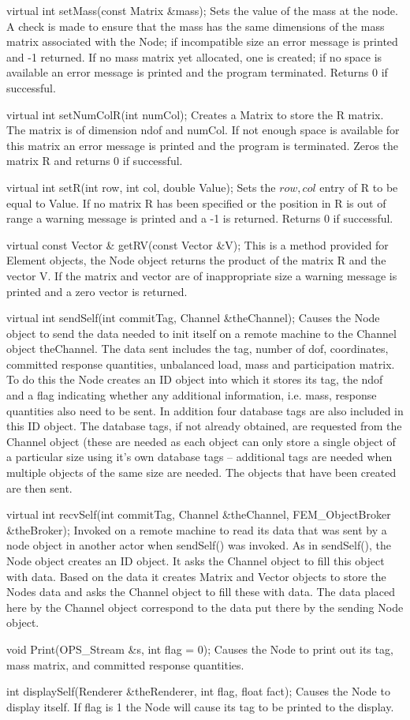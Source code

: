  virtual int setMass(const Matrix &mass); 
Sets the value of the mass at the node. A check is made to ensure that
the  mass has the same dimensions of the mass matrix associated with the
Node; if incompatible size an error message is printed and -1 returned. If no
mass matrix yet allocated, one is created; if no space is available an
error message is printed and the program terminated. Returns 0 if successful. 

  virtual int setNumColR(int numCol); 
Creates a Matrix to store the R matrix. The matrix is of dimension
 ndof and  numCol. If not enough space is available for this
matrix an error message is printed and the program is terminated. Zeros the
matrix R and returns 0 if successful. 

  virtual int setR(int row, int col, double Value); 
Sets the  \(row,col\) entry of R to be equal to  Value. If
no matrix R has been specified or the position in R is out of range a
warning message is printed and a -1 is returned. Returns 0 if
successful. 


  virtual const Vector & getRV(const Vector &V); 
This is a method provided for Element objects, the Node object returns
the product of the matrix R and the vector V. If the matrix 
and vector are of inappropriate size a warning message is printed and
a zero vector is returned. 

 virtual int sendSelf(int commitTag, Channel &theChannel); 
Causes the Node object to send the data needed to init itself on a
remote machine to the Channel object  theChannel. 
The data sent includes the tag, number of dof, coordinates, committed
response quantities, unbalanced load, mass and participation matrix. 
To do this the Node creates an ID object into which it stores its tag,
the  ndof and a flag indicating whether any additional
information, i.e. mass, response quantities also need to be sent. In
addition four database tags are also included in this ID object. The
database tags, if not already obtained, are requested from the Channel
object (these are needed as each object can only store a single object
of a particular size using it's own database tags -- additional tags
are needed when multiple objects of the same size are needed.
The objects that have been created are then sent. 

 virtual int recvSelf(int commitTag, Channel &theChannel,
FEM_ObjectBroker &theBroker);  
Invoked on a remote machine to read its data that was sent by a node
object in another actor when  sendSelf() was invoked. As in 
sendSelf(), the Node object creates an ID object. It asks the Channel
object to fill this object with data. Based on the data it creates
Matrix and Vector objects to store the Nodes data and asks the Channel
object to fill these with data. The data placed here by the Channel
object correspond to the data put there by the sending Node object.


 void Print(OPS_Stream &s, int flag = 0); 
Causes the Node to print out its tag, mass matrix, and committed
response quantities.  

  int displaySelf(Renderer &theRenderer, int flag,
float fact); 
Causes the Node to display itself. If  flag is 1 the Node will
cause its tag to be printed to the display. 



